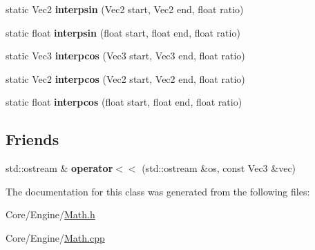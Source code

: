 \begin{DoxyCompactItemize}
\item 
\hypertarget{classDCEngine_1_1Math_a20d27406a07606e9ce4f58a9e882498d}{static Vec2 {\bfseries interpsin} (Vec2 start, Vec2 end, float ratio)}\label{classDCEngine_1_1Math_a20d27406a07606e9ce4f58a9e882498d}

\item 
\hypertarget{classDCEngine_1_1Math_a81a17921f88359cfd56e369e1d503ad4}{static float {\bfseries interpsin} (float start, float end, float ratio)}\label{classDCEngine_1_1Math_a81a17921f88359cfd56e369e1d503ad4}

\item 
\hypertarget{classDCEngine_1_1Math_aa9e3f8322355459f34e63a8528096154}{static Vec3 {\bfseries interpcos} (Vec3 start, Vec3 end, float ratio)}\label{classDCEngine_1_1Math_aa9e3f8322355459f34e63a8528096154}

\item 
\hypertarget{classDCEngine_1_1Math_abfcbb58cd2dee2f4f72ed462b01f1c4b}{static Vec2 {\bfseries interpcos} (Vec2 start, Vec2 end, float ratio)}\label{classDCEngine_1_1Math_abfcbb58cd2dee2f4f72ed462b01f1c4b}

\item 
\hypertarget{classDCEngine_1_1Math_ac2c30fa94db6b13bc6335399f121b7e9}{static float {\bfseries interpcos} (float start, float end, float ratio)}\label{classDCEngine_1_1Math_ac2c30fa94db6b13bc6335399f121b7e9}

\end{DoxyCompactItemize}
\subsection*{Friends}
\begin{DoxyCompactItemize}
\item 
\hypertarget{classDCEngine_1_1Math_aa7320abeb5e514d2827f5b8b687827a0}{std\-::ostream \& {\bfseries operator$<$$<$} (std\-::ostream \&os, const Vec3 \&vec)}\label{classDCEngine_1_1Math_aa7320abeb5e514d2827f5b8b687827a0}

\end{DoxyCompactItemize}


The documentation for this class was generated from the following files\-:\begin{DoxyCompactItemize}
\item 
Core/\-Engine/\hyperlink{Math_8h}{Math.\-h}\item 
Core/\-Engine/\hyperlink{Math_8cpp}{Math.\-cpp}\end{DoxyCompactItemize}

